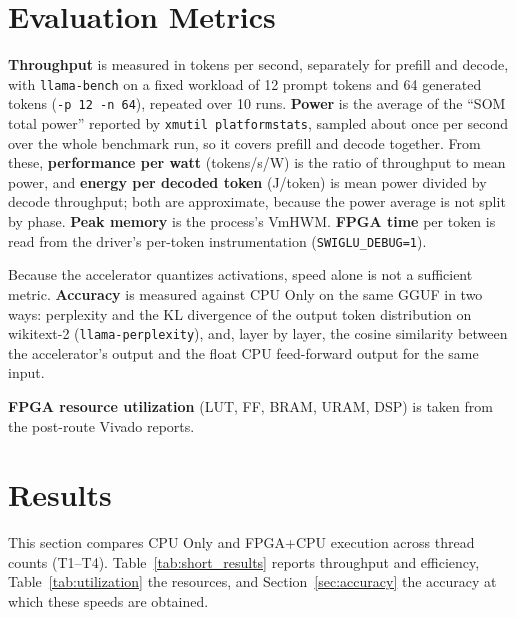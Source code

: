 \section{Evaluation Metrics}
\label{sec:metrics}

\textbf{Throughput} is measured in tokens per second, separately for prefill and decode,
with \texttt{llama-bench} on a fixed workload of 12 prompt tokens and 64 generated
tokens (\texttt{-p 12 -n 64}), repeated over 10 runs. \textbf{Power} is the average of
the ``SOM total power'' reported by \texttt{xmutil platformstats}, sampled about once
per second over the whole benchmark run, so it covers prefill and decode together. From
these, \textbf{performance per watt} (tokens/s/W) is the ratio of throughput to mean
power, and \textbf{energy per decoded token} (J/token) is mean power divided by decode
throughput; both are approximate, because the power average is not split by phase.
\textbf{Peak memory} is the process's VmHWM. \textbf{FPGA time} per token is read from
the driver's per-token instrumentation (\texttt{SWIGLU\_DEBUG=1}).

Because the accelerator quantizes activations, speed alone is not a sufficient metric.
\textbf{Accuracy} is measured against CPU Only on the same GGUF in two ways: perplexity
and the KL divergence of the output token distribution on wikitext-2
(\texttt{llama-perplexity}), and, layer by layer, the cosine similarity between the
accelerator's output and the float CPU feed-forward output for the same input.

\textbf{FPGA resource utilization} (LUT, FF, BRAM, URAM, DSP) is taken from the
post-route Vivado reports.

\section{Results}
\label{sec:results}

This section compares CPU Only and FPGA+CPU execution across thread counts (T1--T4).
Table~\ref{tab:short_results} reports throughput and efficiency,
Table~\ref{tab:utilization} the resources, and Section~\ref{sec:accuracy} the accuracy
at which these speeds are obtained.

